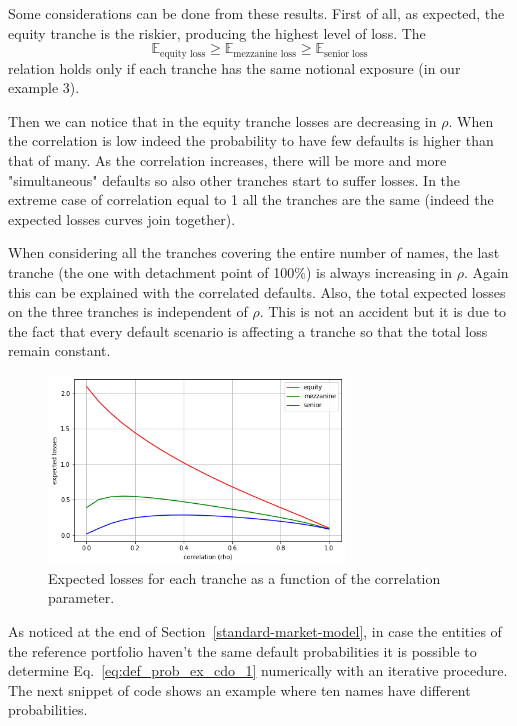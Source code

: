 Some considerations can be done from these results. First of all, as expected, the equity tranche is the riskier, producing the highest level of loss. The 
\[
\mathbb{E}_{\textrm{equity loss}} \ge \mathbb{E}_{\textrm{mezzanine loss}} \ge \mathbb{E}_{\textrm{senior loss}}
\] 
relation holds only if each tranche has the same notional exposure (in our example 3).

Then we can notice that in the equity tranche losses are decreasing in $\rho$. When the correlation is low indeed the probability to have few defaults is higher than that of many. As the correlation increases, there will be more and more "simultaneous" defaults so also other tranches start to suffer losses. In the extreme case of correlation equal to 1 all the tranches are the same (indeed the expected losses curves join together). 

When considering all the tranches covering the entire number of names, the last tranche (the one with detachment point of 100\%) is always increasing in $\rho$. Again this can be explained with the correlated defaults. 
Also, the total expected losses on the three tranches is independent of $\rho$. This is not an accident but it is due to the fact that every default scenario is affecting a tranche so that the total loss remain constant.

\begin{figure}[htb]
	\centering
	\includegraphics[width=0.7\textwidth]{figures/losses_vs_rho}
	\caption{Expected losses for each tranche as a function of the correlation parameter.}
	\label{fig:losses_rho}
\end{figure}

As noticed at the end of Section~\ref{standard-market-model}, in case the entities of the reference portfolio haven't the same default probabilities it is possible to determine Eq.~\ref{eq:def_prob_ex_cdo_1} numerically with an iterative procedure. The next snippet of code shows an example where ten names have different probabilities.

